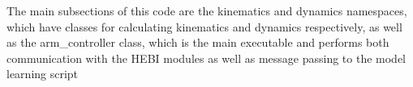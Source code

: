 The main subsections of this code are the kinematics and dynamics namespaces, which have classes for calculating kinematics and dynamics respectively, as well as the arm\+\_\+controller class, which is the main executable and performs both communication with the H\+E\+BI modules as well as message passing to the model learning script 